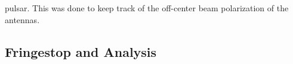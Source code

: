 \documentclass[a4paper,12pt]{article}
\begin{document}
pulsar. This was done to keep track of the off-center beam polarization of the antennas.

                                                                                                                                                                                                                                                                                                                                                                                                                                                                                                                                                                                                                                                                                                                                                                                                                                                                                                                                                                                                                                                                                                                                                                                                                                                                                                                                                                                                                                                                                                                                                                                                                                                                                                                                                                                                                                                                                                                                                                                                                                                                                                                                                                                                                                                                                                                                                                                                                                                                                                                                                                                                                                                                                                                                                                                                                                                                                                                                                                                                                                                                                                                                                                                      \subsection{Fringestop and Analysis}
\end{document}
